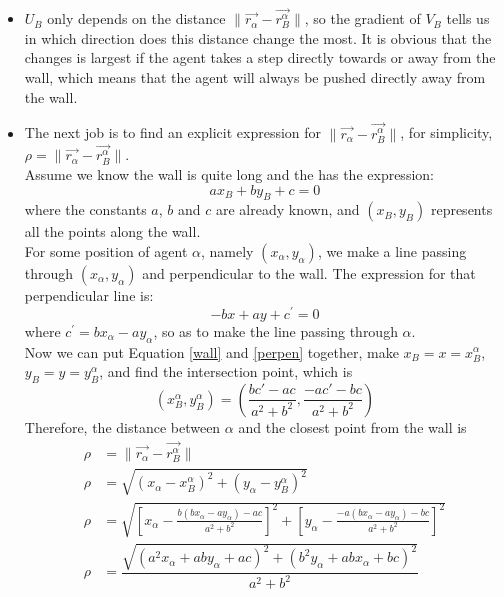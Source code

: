 \begin{itemize}
\item  $U_B$ only depends on the distance $ \| \vec{r_{\alpha}} - \vec{r_{B}^{\alpha}} \|$, so the gradient of $V_B$ tells us in which direction does this distance change the most. It is obvious that the changes is largest if the agent takes a step directly towards or away from the wall, which means that the agent will always be pushed directly away from the wall.

\item The next job is to find an explicit expression for $ \| \vec{r_{\alpha}} - \vec{r_{B}^{\alpha}} \|$, for simplicity, $ \rho = \| \vec{r_{\alpha}} - \vec{r_{B}^{\alpha}} \| $.\\
Assume we know the wall is quite long and the has the expression:
\begin{equation}\label{wall}
ax_{B}+by_{B}+c=0
\end{equation}
where the constants $ a $, $ b $ and $ c $ are already known, and $\left(  x_{B} , y_{B} \right) $ represents all the points along the wall.\\
For some position of agent $ \alpha $, namely $ \left(  x_{\alpha} , y_{\alpha} \right) $, we make a line passing through $ \left(  x_{\alpha} , y_{\alpha} \right) $ and perpendicular to the wall. The expression for that perpendicular line is:
\begin{equation}\label{perpen}
-bx+ay+c^{'}=0
\end{equation}
where $ c^{'} = bx_{\alpha}-ay_{\alpha}$, so as to make the line passing through $ \alpha $.\\

Now we can put Equation \ref{wall} and \ref{perpen} together, make $ x_{B}=x = x^{\alpha}_{B}$, $ y_{B}=y = y^{\alpha}_{B}$, and find the intersection point, which is 
\begin{equation}
\left( 
x^{\alpha}_{B},
y^{\alpha}_{B}
\right)
=
\left( 
\frac{bc'-ac}{a^{2}+b^{2}},
\frac{-ac'-bc}{a^{2}+b^{2}}
\right) 
\end{equation}
Therefore, the distance between $ \alpha $ and the closest point from the wall is 
\begin{align}
\rho &= \| \vec{r_{\alpha}} - \vec{r_{B}^{\alpha}} \| \\
\rho&=\sqrt{\left( x_{\alpha} - x^{\alpha}_{B}\right) ^{2} + \left( y_{\alpha} - y^{\alpha}_{B}\right) ^{2}}\\
\rho&=\sqrt{\left[ x_{\alpha} - \frac{b\left( bx_{\alpha}-ay_{\alpha}\right) -ac}{a^{2}+b^{2}}\right] ^{2} + \left[ y_{\alpha} - \frac{-a\left( bx_{\alpha}-ay_{\alpha}\right) -bc}{a^{2}+b^{2}}\right] ^{2}}\\ \label{rho}
\rho&=\dfrac{\sqrt{\left( a^{2}x_{\alpha}+aby_{\alpha}+ac \right) ^{2} + \left( b^{2}y_{\alpha}+abx_{\alpha}+bc\right) ^{2}}}
{a^{2}+b^{2}}
\end{align}


\end{itemize}
